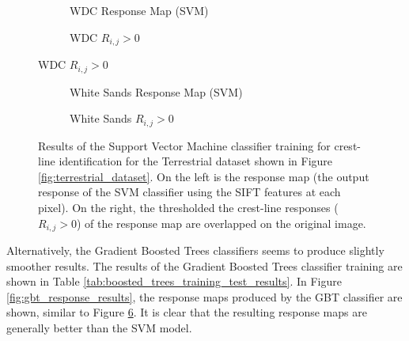 \begin{figure}[H]
	\ContinuedFloat
	\centering
	\begin{subfigure}{0.48\textwidth}
		\centering
		\caption{WDC Response Map (SVM)}
		\label{fig:WDC_SVM_response}
	\end{subfigure}
	\begin{subfigure}{0.48\textwidth}
		\centering
		\caption{ WDC $R_{i,j} > 0$}
		\label{fig:WDC_SVM_response_overlay}
	\end{subfigure}
\end{figure}
\begin{figure}[H]
	\ContinuedFloat
	\centering
	\begin{subfigure}{0.48\textwidth}
		\centering
		\caption{White Sands Response Map (SVM)}
		\label{fig:WhiteSands_SVM_response}
	\end{subfigure}
	\begin{subfigure}{0.48\textwidth}
		\centering
		\caption{ White Sands $R_{i,j} > 0$}
		\label{fig:WhiteSands_SVM_response_overlay}
	\end{subfigure}
	\caption{Results of the Support Vector Machine classifier training for crest-line identification for the Terrestrial dataset shown in Figure \ref{fig:terrestrial_dataset}. On the left is the response map (the output response of the SVM classifier using the SIFT features at each pixel). On the right, the thresholded the crest-line responses ($R_{i,j} > 0$) of the response map are overlapped on the original image. }
	\label{fig:SVM_response_results}
\end{figure}

Alternatively, the Gradient Boosted Trees classifiers seems to produce slightly smoother results. The results of the Gradient Boosted Trees classifier training are shown in Table \ref{tab:boosted_trees_training_test_results}. In Figure \ref{fig:gbt_response_results}, the response maps produced by the GBT classifier are shown, similar to Figure \ref{fig:SVM_response_results}. It is clear that the resulting response maps are generally better than the SVM model.

